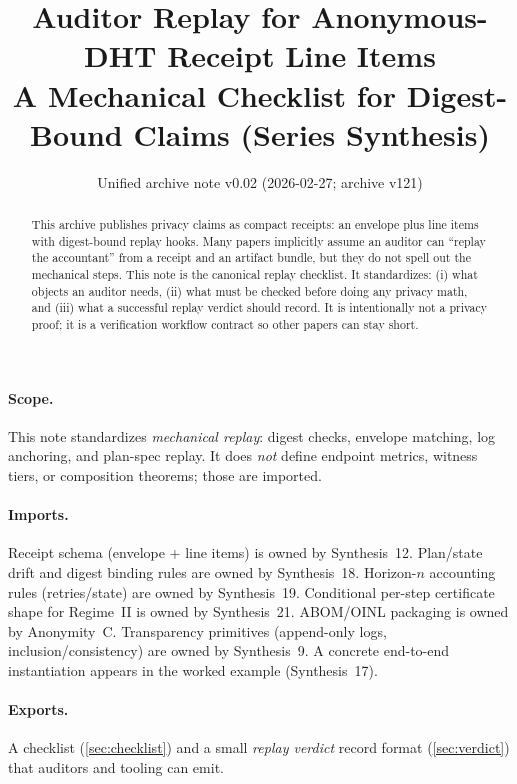 \documentclass[11pt]{article}
\title{Auditor Replay for Anonymous-DHT Receipt Line Items\\
\large A Mechanical Checklist for Digest-Bound Claims (Series Synthesis)}
\author{}
\date{Unified archive note v0.02 (2026-02-27; archive v121)}
\begin{document}
\maketitle

\begin{abstract}
This archive publishes privacy claims as compact receipts: an envelope plus line items with digest-bound replay hooks.
Many papers implicitly assume an auditor can ``replay the accountant'' from a receipt and an artifact bundle, but they do not spell out the mechanical steps.
This note is the canonical replay checklist.
It standardizes: (i) what objects an auditor needs, (ii) what must be checked before doing any privacy math, and (iii) what a successful replay verdict should record.
It is intentionally not a privacy proof; it is a verification workflow contract so other papers can stay short.
\end{abstract}

\paragraph{Scope.}
This note standardizes \emph{mechanical replay}: digest checks, envelope matching, log anchoring, and plan-spec replay.
It does \emph{not} define endpoint metrics, witness tiers, or composition theorems; those are imported.

\paragraph{Imports.}
Receipt schema (envelope + line items) is owned by Synthesis~12.\cite{series:receiptitems}
Plan/state drift and digest binding rules are owned by Synthesis~18.\cite{series:planstateequiv}
Horizon-$n$ accounting rules (retries/state) are owned by Synthesis~19.\cite{series:accountingrulebook}
Conditional per-step certificate shape for Regime~II is owned by Synthesis~21.\cite{series:condcert}
ABOM/OINL packaging is owned by Anonymity~C.\cite{series:abomoinl}
Transparency primitives (append-only logs, inclusion/consistency) are owned by Synthesis~9.\cite{series:transparencyprimitives}
A concrete end-to-end instantiation appears in the worked example (Synthesis~17).\cite{series:workedexample}

\paragraph{Exports.}
A checklist (\cref{sec:checklist}) and a small \emph{replay verdict} record format (\cref{sec:verdict}) that auditors and tooling can emit.
\end{document}
